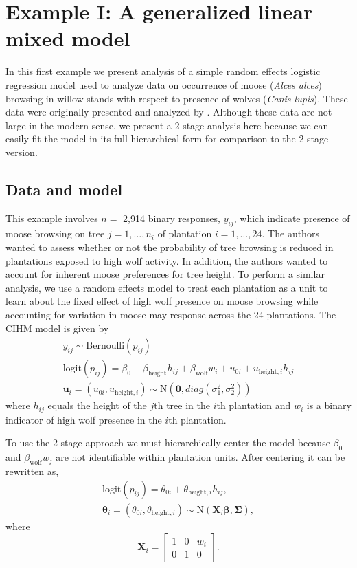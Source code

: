 \documentclass[12pt]{article}
\newcommand{\bt}{\boldsymbol{\theta}}
\newcommand{\bb}{\boldsymbol{\beta}}
\newcommand{\bSig}{\boldsymbol{\Sigma}}
\begin{document}
\section{Example I: A generalized linear mixed model} \label{sec:moose.wolf}

In this first example we present analysis of a simple random effects logistic regression model used to analyze data on occurrence of moose ({\it Alces alces}) browsing in willow stands with respect to presence of wolves ({\it Canis lupis}). These data were originally presented and analyzed by \cite{van2018does}. Although these data are not large in the modern sense, we present a 2-stage analysis here because we can easily fit the model in its full hierarchical form for comparison to the 2-stage version. 

\subsection{Data and model}

This example involves $n =$ 2,914 binary responses, $y_{ij}$, which indicate presence of moose browsing on tree $j=1,\dots,n_i$ of plantation $i=1,\dots,24$. The authors wanted to assess whether or not the probability of tree browsing is reduced in plantations exposed to high wolf activity. In addition, the authors wanted to account for inherent moose preferences for tree height. To perform a similar analysis, we use a random effects model to treat each plantation as a unit to learn about the fixed effect of high wolf presence on moose browsing while accounting for variation in moose may response across the 24 plantations. The CIHM model is given by
\[
\begin{gathered}
y_{ij} \sim \text{Bernoulli}(p_{ij}) \\
\text{logit}(p_{ij}) = \beta_0 + \beta_{\text{height}}h_{ij} + \beta_{\text{wolf}}w_i + u_{0i} + u_{\text{height},i} h_{ij}\\
\mathbf{u}_i = (u_{0i}, u_{\text{height},i}) \sim \text{N}(\mathbf{0},diag(\sigma_1^2, \sigma_2^2))
\end{gathered}
\]
where $h_{ij}$ equals the height of the $j$th tree in the $i$th plantation and $w_i$ is a binary indicator of high wolf presence in the $i$th plantation.

To use the 2-stage approach we must hierarchically center the model because $\beta_0$ and $\beta_{\text{wolf}}w_j$ are not identifiable within plantation units. After centering it can be rewritten as,
\[
\begin{gathered}
\text{logit}(p_{ij}) = \theta_{0i} + \theta_{\text{height},i}h_{ij},\\
\bt_i = (\theta_{0i}, \theta_{\text{height},i}) \sim \text{N}(\mathbf{X}_i\bb, \bSig) ,
\end{gathered}
\]
where
\[
\mathbf{X}_i = \left[ 
\begin{array}{ccc}
1 & 0 & w_i \\
0 & 1 & 0
\end{array}
\right].
\]
\end{document}
